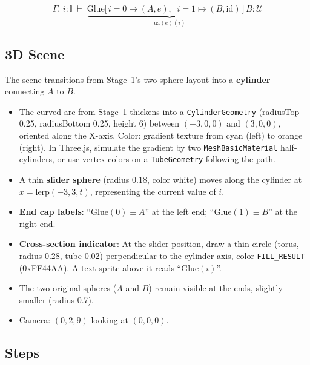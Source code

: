 \documentclass[11pt,a4paper]{article}
\begin{document}
\[
  \Gamma,\,i{:}\mathbb{I} \;\vdash\;
  \underbrace{
    \mathrm{Glue}\bigl[\,i{=}0\mapsto(A,e),\;\;i{=}1\mapsto(B,\mathrm{id})\,\bigr]\,B
  }_{\mathrm{ua}(e)(i)} : \mathcal{U}
\]

\subsection{3D Scene}

The scene transitions from Stage~1's two-sphere layout into a \textbf{cylinder}
connecting $A$ to $B$.

\begin{itemize}
  \item The curved arc from Stage~1 thickens into a \texttt{CylinderGeometry}
    (radiusTop 0.25, radiusBottom 0.25, height 6) between $(-3,0,0)$ and
    $(3,0,0)$, oriented along the X-axis.
    Color: gradient texture from \textcolor{colorInterval}{cyan} (left) to
    \textcolor{colorResult}{orange} (right).
    In Three.js, simulate the gradient by two
    \texttt{MeshBasicMaterial} half-cylinders, or use vertex colors on a
    \texttt{TubeGeometry} following the path.
  \item A thin \textbf{slider sphere} (radius 0.18, color white) moves along
    the cylinder at $x = \mathrm{lerp}(-3, 3, t)$, representing the current
    value of $i$.
  \item \textbf{End cap labels}: ``$\mathrm{Glue}(0) \equiv A$'' at the left
    end; ``$\mathrm{Glue}(1) \equiv B$'' at the right end.
  \item \textbf{Cross-section indicator}: At the slider position, draw a thin
    circle (torus, radius 0.28, tube 0.02) perpendicular to the cylinder axis,
    color \textcolor{colorFill}{\texttt{FILL\_RESULT}} (0xFF44AA). A text sprite
    above it reads ``$\mathrm{Glue}(i)$''.
  \item The two original spheres ($A$ and $B$) remain visible at the ends,
    slightly smaller (radius 0.7).
  \item Camera: $(0, 2, 9)$ looking at $(0, 0, 0)$.
\end{itemize}

\subsection{Steps}
\end{document}
